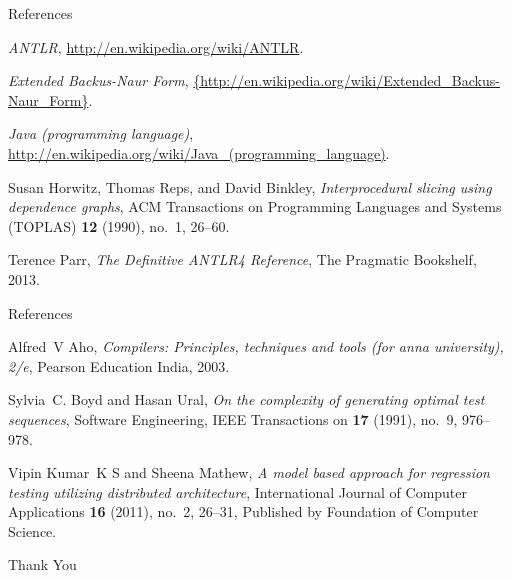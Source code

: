 \providecommand{\bysame}{\leavevmode\hbox to3em{\hrulefill}\thinspace}
\providecommand{\MR}{\relax\ifhmode\unskip\space\fi MR }
\providecommand{\MRhref}[2]{
  \href{http://www.ams.org/mathscinet-getitem?mr=#1}{#2}
}
\providecommand{\href}[2]{#2}
\begin{tframe}{References}
    \begin{thebibliography}{4}
        \emph{{ANTLR}}, \url{http://en.wikipedia.org/wiki/ANTLR}.

        \emph{{Extended Backus-Naur Form}},
          \url{{http://en.wikipedia.org/wiki/Extended_Backus-Naur_Form}}.

        \emph{Java (programming language)},
          \url{http://en.wikipedia.org/wiki/Java_(programming_language)}.

        Susan Horwitz, Thomas Reps, and David Binkley, \emph{Interprocedural slicing
          using dependence graphs}, ACM Transactions on Programming Languages and
          Systems (TOPLAS) \textbf{12} (1990), no.~1, 26--60.

        Terence Parr, \emph{{T}he {D}efinitive {ANTLR}4 {R}eference}, The Pragmatic
          Bookshelf, 2013.

    \end{thebibliography}
\end{tframe}

\begin{tframe}{References}
    \begin{thebibliography}{4}

        Alfred~V Aho, \emph{Compilers: Principles, techniques and tools (for anna
          university), 2/e}, Pearson Education India, 2003.
          
        Sylvia~C. Boyd and Hasan Ural, \emph{On the complexity of generating optimal
          test sequences}, Software Engineering, IEEE Transactions on \textbf{17}
          (1991), no.~9, 976--978.

        Vipin Kumar~K S and Sheena Mathew, \emph{A model based approach for regression
          testing utilizing distributed architecture}, International Journal of
          Computer Applications \textbf{16} (2011), no.~2, 26--31, Published by
          Foundation of Computer Science.
    \end{thebibliography}
\end{tframe}

\begin{frame}
    \begin{center}
        \huge{Thank You}
    \end{center}
\end{frame}
